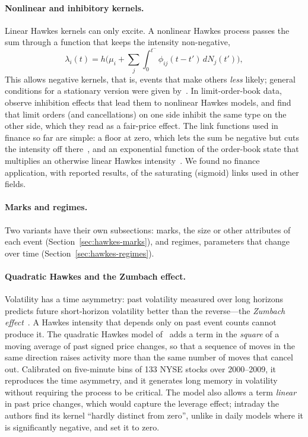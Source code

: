\paragraph{Nonlinear and inhibitory kernels.} Linear Hawkes kernels can only excite. A nonlinear Hawkes
process passes the sum through a function that keeps the intensity non-negative,
\[
  \lambda_i(t) = h\big(\mu_i + \sum_j \int_0^{t^-} \phi_{ij}(t-t')\, dN_j(t')\big),
\]
This allows negative
kernels, that is, events that make others \emph{less} likely; general conditions for a stationary
version were given by~\citet{bremaud1996}. In limit-order-book data, \citet{lu2018} observe inhibition
effects that lead them to nonlinear Hawkes models, and \citet{rambaldi2017marked} find that limit orders
(and cancellations) on one side inhibit the same type on the other side, which they read as a
fair-price effect. The link functions used in finance so far are simple: a floor at zero, which lets the
sum be negative but cuts the intensity off there~\citep{jain2024chp}, and an exponential function of the
order-book state that multiplies an otherwise linear Hawkes intensity~\citep{sfendourakis2020,mucciante2024}. We found no finance application, with
reported results, of the saturating (sigmoid) links used in other fields.

\paragraph{Marks and regimes.} Two variants have their own subsections: marks, the size or other attributes of
each event (Section~\ref{sec:hawkes-marks}), and regimes, parameters that change over time
(Section~\ref{sec:hawkes-regimes}).

\paragraph{Quadratic Hawkes and the Zumbach effect.} Volatility has a time asymmetry: past volatility
measured over long horizons predicts future short-horizon volatility better than the reverse---the
\emph{Zumbach effect}~\citep{zumbach2009}. A Hawkes intensity that depends only on past event counts
cannot produce it. The quadratic Hawkes model of~\citet{blanc2017qhawkes} adds a term in the
\emph{square} of a moving average of past signed price changes, so that a sequence of moves in the same
direction raises activity more than the same number of moves that cancel out. Calibrated on five-minute
bins of 133 NYSE stocks over 2000--2009, it reproduces the time asymmetry, and it generates long memory
in volatility without requiring the process to be critical. The model also allows a term \emph{linear} in
past price changes, which would capture the leverage effect; intraday the authors find its kernel
``hardly distinct from zero'', unlike in daily models where it is significantly negative, and set it to
zero.

